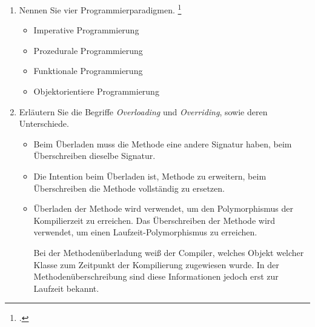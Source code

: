 \documentclass{bschlangaul-aufgabe}
\begin{document}

\begin{enumerate}


\item Nennen Sie vier Programmierparadigmen.
\footcite{examen:66116:2021:03}

\begin{bAntwort}
\begin{itemize}
\item Imperative Programmierung
\item Prozedurale Programmierung
\item Funktionale Programmierung
\item Objektorientiere Programmierung
\end{itemize}
\end{bAntwort}


\item Erläutern Sie die Begriffe \emph{Overloading} und
\emph{Overriding}, sowie deren
Unterschiede.

\begin{bAntwort}
\begin{itemize}
\item Beim Überladen muss die Methode eine andere Signatur haben, beim
Überschreiben dieselbe Signatur.

\item Die Intention beim Überladen ist, Methode zu erweitern, beim
Überschreiben die Methode vollständig zu ersetzen.

\item Überladen der Methode wird verwendet, um den Polymorphismus der
Kompilierzeit zu erreichen. Das Überschreiben der Methode wird
verwendet, um einen Laufzeit-Polymorphismus zu erreichen.

Bei der Methodenüberladung weiß der Compiler, welches Objekt
welcher Klasse zum Zeitpunkt der Kompilierung zugewiesen wurde. In
der Methodenüberschreibung sind diese Informationen jedoch erst zur
Laufzeit bekannt.


\end{itemize}
\end{bAntwort}
\end{enumerate}
\end{document}
